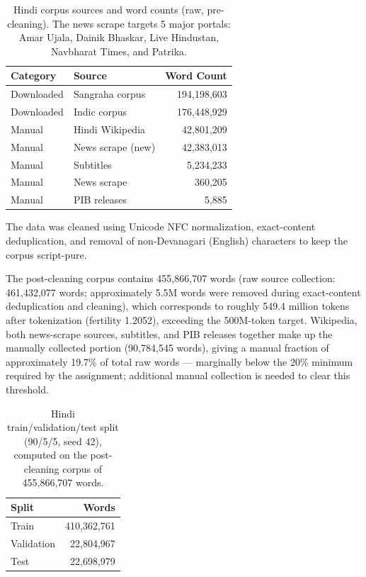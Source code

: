 \documentclass[11pt]{article}
\begin{document}
\begin{table}[h]
\centering
\begin{tabular}{lp{5cm}r}
\toprule
\textbf{Category} & \textbf{Source} & \textbf{Word Count} \\
\midrule
Downloaded & Sangraha corpus & 194{,}198{,}603 \\
Downloaded & Indic corpus & 176{,}448{,}929 \\
Manual & Hindi Wikipedia & 42{,}801{,}209 \\
Manual & News scrape (new) & 42{,}383{,}013 \\
Manual & Subtitles & 5{,}234{,}233 \\
Manual & News scrape & 360{,}205 \\
Manual & PIB releases & 5{,}885 \\
\bottomrule
\end{tabular}
\caption{Hindi corpus sources and word counts (raw, pre-cleaning). The news scrape targets 5 major portals: Amar Ujala, Dainik Bhaskar, Live Hindustan, Navbharat Times, and Patrika.}
\end{table}

The data was cleaned using Unicode NFC normalization, exact-content deduplication, and removal of non-Devanagari (English) characters to keep the corpus script-pure.

The post-cleaning corpus contains 455,866,707 words (raw source collection: 461,432,077 words; approximately 5.5M words were removed during exact-content deduplication and cleaning), which corresponds to roughly 549.4 million tokens after tokenization (fertility 1.2052), exceeding the 500M-token target. Wikipedia, both news-scrape sources, subtitles, and PIB releases together make up the manually collected portion (90,784,545 words), giving a manual fraction of approximately 19.7\% of total raw words --- marginally below the 20\% minimum required by the assignment; additional manual collection is needed to clear this threshold.

\begin{table}[h]
\centering
\begin{tabular}{lr}
\toprule
\textbf{Split} & \textbf{Words} \\
\midrule
Train & 410{,}362{,}761 \\
Validation & 22{,}804{,}967 \\
Test & 22{,}698{,}979 \\
\bottomrule
\end{tabular}
\caption{Hindi train/validation/test split (90/5/5, seed 42), computed on the post-cleaning corpus of 455,866,707 words.}
\end{table}
\end{document}
